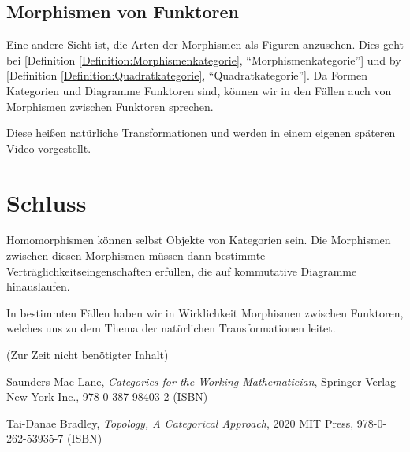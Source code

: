 \documentclass[a4paper]{amsart}
\theoremstyle{definition}
\newcommand{\myRef}[2]{[#1 \ref{#1:#2}, ``#2'']}
\begin{document}
\subsection{Morphismen von Funktoren}
Eine andere Sicht ist, die Arten der Morphismen als Figuren anzusehen. Dies geht bei \myRef{Definition}{Morphismenkategorie} und by \myRef{Definition}{Quadratkategorie}. Da Formen Kategorien und Diagramme Funktoren sind, können wir in den Fällen auch von Morphismen zwischen Funktoren sprechen.

Diese heißen natürliche Transformationen und werden in einem eigenen späteren Video vorgestellt.

\section{Schluss}
Homomorphismen können selbst Objekte von Kategorien sein. Die Morphismen zwischen diesen Morphismen müssen dann bestimmte Verträglichkeitseingenschaften erfüllen, die auf kommutative Diagramme hinauslaufen.

In bestimmten Fällen haben wir in Wirklichkeit Morphismen zwischen Funktoren, welches uns zu dem Thema der natürlichen Transformationen leitet.

\begin{backup}
    (Zur Zeit nicht benötigter Inhalt)
\end{backup}

\begin{thebibliography}{9}

      Saunders Mac Lane, \emph{Categories for the Working Mathematician},
      Springer-Verlag New York Inc., 978-0-387-98403-2 (ISBN)
      
      Tai-Danae Bradley, \emph{Topology, A Categorical Approach},
      2020 MIT Press, 978-0-262-53935-7 (ISBN)
      
\end{thebibliography}
\end{document}

